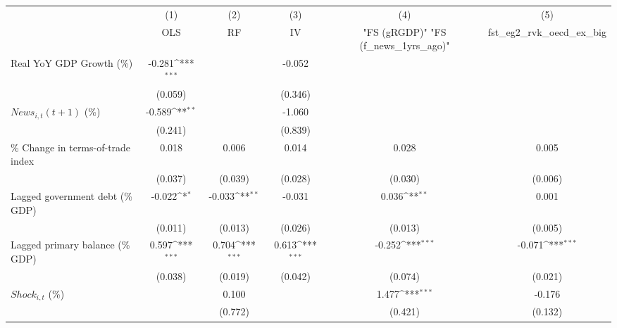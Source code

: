 {
\def\sym#1{\ifmmode^{#1}\else\(^{#1}\)\fi}
\begin{tabular}{l*{5}{c}}
\toprule
                    &\multicolumn{1}{c}{(1)}&\multicolumn{1}{c}{(2)}&\multicolumn{1}{c}{(3)}&\multicolumn{1}{c}{(4)}&\multicolumn{1}{c}{(5)}\\
                    &\multicolumn{1}{c}{OLS}&\multicolumn{1}{c}{RF}&\multicolumn{1}{c}{IV}&\multicolumn{1}{c}{ "FS (gRGDP)"  "FS (f_news_1yrs_ago)" }&\multicolumn{1}{c}{fst_eg2_rvk_oecd_ex_big}\\
\midrule
Real YoY GDP Growth (\%)&      -0.281\sym{***}&                     &      -0.052         &                     &                     \\
                    &     (0.059)         &                     &     (0.346)         &                     &                     \\
\addlinespace
$ News_{i,t}(t+1)$ (\%)&      -0.589\sym{**} &                     &      -1.060         &                     &                     \\
                    &     (0.241)         &                     &     (0.839)         &                     &                     \\
\addlinespace
\% Change in terms-of-trade index&       0.018         &       0.006         &       0.014         &       0.028         &       0.005         \\
                    &     (0.037)         &     (0.039)         &     (0.028)         &     (0.030)         &     (0.006)         \\
\addlinespace
Lagged government debt (\% GDP)&      -0.022\sym{*}  &      -0.033\sym{**} &      -0.031         &       0.036\sym{**} &       0.001         \\
                    &     (0.011)         &     (0.013)         &     (0.026)         &     (0.013)         &     (0.005)         \\
\addlinespace
Lagged primary balance (\% GDP)&       0.597\sym{***}&       0.704\sym{***}&       0.613\sym{***}&      -0.252\sym{***}&      -0.071\sym{***}\\
                    &     (0.038)         &     (0.019)         &     (0.042)         &     (0.074)         &     (0.021)         \\
\addlinespace
$ Shock_{i,t}$ (\%) &                     &       0.100         &                     &       1.477\sym{***}&      -0.176         \\
                    &                     &     (0.772)         &                     &     (0.421)         &     (0.132)         \\

\end{tabular}}
